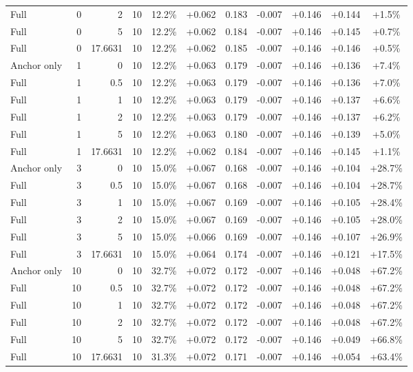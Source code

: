 \begin{table}[htbp]
\begin{tabular}{lrrrccccccc}
Full & 0 & 2 & 10 & 12.2\% & +0.062 & 0.183 & -0.007 & +0.146 & +0.144 & +1.5\% \\
Full & 0 & 5 & 10 & 12.2\% & +0.062 & 0.184 & -0.007 & +0.146 & +0.145 & +0.7\% \\
Full & 0 & 17.6631 & 10 & 12.2\% & +0.062 & 0.185 & -0.007 & +0.146 & +0.146 & +0.5\% \\
Anchor only & 1 & 0 & 10 & 12.2\% & +0.063 & 0.179 & -0.007 & +0.146 & +0.136 & +7.4\% \\
Full & 1 & 0.5 & 10 & 12.2\% & +0.063 & 0.179 & -0.007 & +0.146 & +0.136 & +7.0\% \\
Full & 1 & 1 & 10 & 12.2\% & +0.063 & 0.179 & -0.007 & +0.146 & +0.137 & +6.6\% \\
Full & 1 & 2 & 10 & 12.2\% & +0.063 & 0.179 & -0.007 & +0.146 & +0.137 & +6.2\% \\
Full & 1 & 5 & 10 & 12.2\% & +0.063 & 0.180 & -0.007 & +0.146 & +0.139 & +5.0\% \\
Full & 1 & 17.6631 & 10 & 12.2\% & +0.062 & 0.184 & -0.007 & +0.146 & +0.145 & +1.1\% \\
Anchor only & 3 & 0 & 10 & 15.0\% & +0.067 & 0.168 & -0.007 & +0.146 & +0.104 & +28.7\% \\
Full & 3 & 0.5 & 10 & 15.0\% & +0.067 & 0.168 & -0.007 & +0.146 & +0.104 & +28.7\% \\
Full & 3 & 1 & 10 & 15.0\% & +0.067 & 0.169 & -0.007 & +0.146 & +0.105 & +28.4\% \\
Full & 3 & 2 & 10 & 15.0\% & +0.067 & 0.169 & -0.007 & +0.146 & +0.105 & +28.0\% \\
Full & 3 & 5 & 10 & 15.0\% & +0.066 & 0.169 & -0.007 & +0.146 & +0.107 & +26.9\% \\
Full & 3 & 17.6631 & 10 & 15.0\% & +0.064 & 0.174 & -0.007 & +0.146 & +0.121 & +17.5\% \\
Anchor only & 10 & 0 & 10 & 32.7\% & +0.072 & 0.172 & -0.007 & +0.146 & +0.048 & +67.2\% \\
Full & 10 & 0.5 & 10 & 32.7\% & +0.072 & 0.172 & -0.007 & +0.146 & +0.048 & +67.2\% \\
Full & 10 & 1 & 10 & 32.7\% & +0.072 & 0.172 & -0.007 & +0.146 & +0.048 & +67.2\% \\
Full & 10 & 2 & 10 & 32.7\% & +0.072 & 0.172 & -0.007 & +0.146 & +0.048 & +67.2\% \\
Full & 10 & 5 & 10 & 32.7\% & +0.072 & 0.172 & -0.007 & +0.146 & +0.049 & +66.8\% \\
Full & 10 & 17.6631 & 10 & 31.3\% & +0.072 & 0.171 & -0.007 & +0.146 & +0.054 & +63.4\% \\

\end{tabular}
\end{table}
